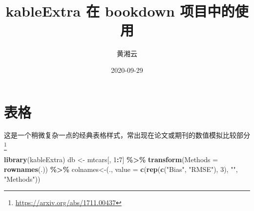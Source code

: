 \documentclass[
]{ctexbook}
\title{kableExtra 在 bookdown 项目中的使用}
\author{黄湘云}
\date{2020-09-29}
\newenvironment{Shaded}{\begin{snugshade}}{\end{snugshade}}
\newcommand{\DataTypeTok}[1]{\textcolor[rgb]{0.13,0.29,0.53}{#1}}
\newcommand{\DecValTok}[1]{\textcolor[rgb]{0.00,0.00,0.81}{#1}}
\newcommand{\KeywordTok}[1]{\textcolor[rgb]{0.13,0.29,0.53}{\textbf{#1}}}
\newcommand{\NormalTok}[1]{#1}
\newcommand{\OperatorTok}[1]{\textcolor[rgb]{0.81,0.36,0.00}{\textbf{#1}}}
\newcommand{\StringTok}[1]{\textcolor[rgb]{0.31,0.60,0.02}{#1}}
\begin{document}
\maketitle

{
\hypersetup{linkcolor=}
\setcounter{tocdepth}{1}
\tableofcontents
}
\hypertarget{table}{%
\chapter{表格}\label{table}}

这是一个稍微复杂一点的经典表格样式，常出现在论文或期刊的数值模拟比较部分\footnote{\url{https://arxiv.org/abs/1711.00437}}

\begin{Shaded}
\begin{Highlighting}[]
\KeywordTok{library}\NormalTok{(kableExtra)}
\NormalTok{db \textless{}{-}}\StringTok{ }\NormalTok{mtcars[, }\DecValTok{1}\OperatorTok{:}\DecValTok{7}\NormalTok{] }\OperatorTok{\%\textgreater{}\%}\StringTok{ }
\StringTok{  }\KeywordTok{transform}\NormalTok{(}\DataTypeTok{Methods =} \KeywordTok{rownames}\NormalTok{(.)) }\OperatorTok{\%\textgreater{}\%}\StringTok{ }
\StringTok{  \textasciigrave{}}\DataTypeTok{colnames\textless{}{-}}\StringTok{\textasciigrave{}}\NormalTok{(., }\DataTypeTok{value =} \KeywordTok{c}\NormalTok{(}\KeywordTok{rep}\NormalTok{(}\KeywordTok{c}\NormalTok{(}\StringTok{"Bias"}\NormalTok{, }\StringTok{"RMSE"}\NormalTok{), }\DecValTok{3}\NormalTok{), }\StringTok{""}\NormalTok{, }\StringTok{"Methods"}\NormalTok{))}
\end{Highlighting}
\end{Shaded}
\end{document}
